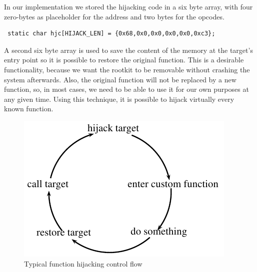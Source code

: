 In our implementation we stored the hijacking code in a six byte array, with 
four zero-bytes as placeholder for the address and two bytes for the opcodes.
\lstset{style=customc}
\begin{lstlisting}
 static char hjc[HIJACK_LEN] = {0x68,0x0,0x0,0x0,0x0,0xc3};
\end{lstlisting}
A second six byte array is used to save the content of the memory at the 
target's entry point so it is possible to restore the original function.
This is a desirable functionality, because we want the rootkit to be removable 
without crashing the system afterwards. Also, the original function will not be 
replaced by a new function, so, in most cases, we need to be able to use it for 
our own purposes at any given time. Using this technique, it is possible to 
hijack virtually every known function.
\begin{figure}
\centering
 \includegraphics{control_flow}
 \caption{Typical function hijacking control flow}
\end{figure}
